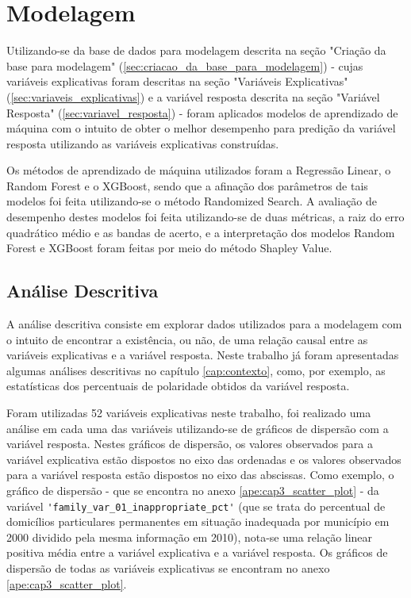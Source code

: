 \chapter{Modelagem}
\label{cap:modelagem}

Utilizando-se da base de dados para modelagem descrita na seção "Criação da base para modelagem" (\ref{sec:criacao_da_base_para_modelagem}) - cujas variáveis explicativas foram descritas na seção "Variáveis Explicativas" (\ref{sec:variaveis_explicativas}) e a variável resposta descrita na seção "Variável Resposta" (\ref{sec:variavel_resposta}) - foram aplicados modelos de aprendizado de máquina com o intuito de obter o melhor desempenho para predição da variável resposta utilizando as variáveis explicativas construídas.

Os métodos de aprendizado de máquina utilizados foram a Regressão Linear, o Random Forest e o XGBoost, sendo que a afinação dos parâmetros de tais modelos foi feita utilizando-se o método Randomized Search. A avaliação de desempenho destes modelos foi feita utilizando-se de duas métricas, a raiz do erro quadrático médio e as bandas de acerto, e a interpretação dos modelos Random Forest e XGBoost foram feitas por meio do método Shapley Value.

\section{Análise Descritiva}
\label{sec:analise_descritiva}

A análise descritiva consiste em explorar dados utilizados para a modelagem com o intuito de encontrar a existência, ou não, de uma relação causal entre as variáveis explicativas e a variável resposta. Neste trabalho já foram apresentadas algumas análises descritivas no capítulo \ref{cap:contexto}, como, por exemplo, as estatísticas dos percentuais de polaridade obtidos da variável resposta.

Foram utilizadas 52 variáveis explicativas neste trabalho, foi realizado uma análise em cada uma das variáveis utilizando-se de gráficos de dispersão com a variável resposta. Nestes gráficos de dispersão, os valores observados para a variável explicativa estão dispostos no eixo das ordenadas e os valores observados para a variável resposta estão dispostos no eixo das abscissas. Como exemplo, o gráfico de dispersão - que se encontra no anexo \ref{ape:cap3_scatter_plot} - da variável \verb|'family_var_01_inappropriate_pct'| (que se trata do percentual de domicílios particulares permanentes em situação inadequada por município em 2000 dividido pela mesma informação em 2010), nota-se uma relação linear positiva média entre a variável explicativa e a variável resposta. Os gráficos de dispersão de todas as variáveis explicativas se encontram no anexo \ref{ape:cap3_scatter_plot}.

